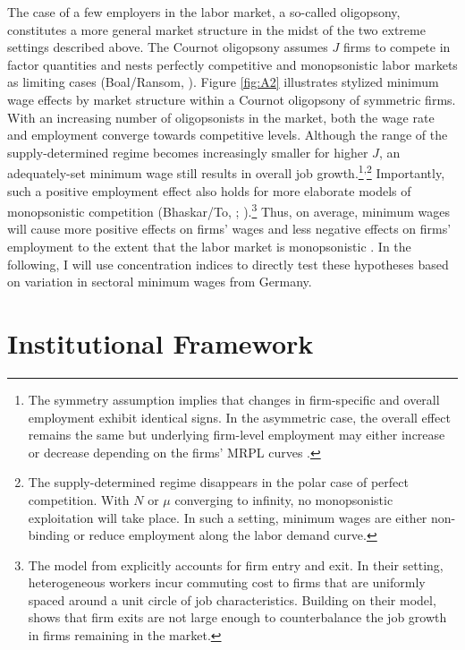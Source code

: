 \documentclass[11pt,oneside,reqno,xcolor=dvipsnames]{article} %
\newcommand\fnsep{\textsuperscript{,}} %
\begin{document}
The case of a few employers in the labor market, a so-called oligopsony, constitutes a more general market structure in the midst of the two extreme settings described above. The Cournot oligopsony assumes $J$ firms to compete in factor quantities and nests perfectly competitive and monopsonistic labor markets as limiting cases (Boal/Ransom, \citeyear{BoalRansom1997}). Figure \ref{fig:A2} illustrates stylized minimum wage effects by market structure within a Cournot oligopsony of symmetric firms. With an increasing number of oligopsonists in the market, both the wage rate and employment converge towards competitive levels. Although the range of the supply-determined regime becomes increasingly smaller for higher $J$, an adequately-set minimum wage still results in overall job growth.\footnote{The symmetry assumption implies that changes in firm-specific and overall employment exhibit identical signs. In the asymmetric case, the overall effect remains the same but underlying firm-level employment may either increase or decrease depending on the firms' MRPL curves \citep{Manning2003a}.}\fnsep\footnote{The supply-determined regime disappears in the polar case of perfect competition. With $N$ or $\mu$ converging to infinity, no monopsonistic exploitation will take place. In such a setting, minimum wages are either non-binding or reduce employment along the labor demand curve.} Importantly, such a positive employment effect also holds for more elaborate models of monopsonistic competition (Bhaskar/To, \citeyear{BhaskarTo1999}; \citealp{Walsh2003}).\footnote{The model from \citet{BhaskarTo1999} explicitly accounts for firm entry and exit. In their setting, heterogeneous workers incur commuting cost to firms that are uniformly spaced around a unit circle of job characteristics. Building on their model, \citet{Walsh2003} shows that firm exits are not large enough to counterbalance the job growth in firms remaining in the market.} Thus, on average, minimum wages will cause more positive effects on firms' wages and less negative effects on firms' employment to the extent that the labor market is monopsonistic \citep{BhaskarEtAl2002}. In the following, I will use concentration indices to directly test these hypotheses based on variation in sectoral minimum wages from Germany.











\section{Institutional Framework}
\label{sec:3}
\end{document}
